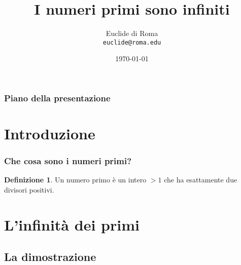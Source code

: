 \documentclass{beamer} %
\title{I numeri primi sono infiniti}
\author[Euclide]{Euclide di Roma\\\texttt{euclide@roma.edu}}
\date[Roma]{\today}
\institute[Roma]{DIPARTIMENTO DI INGEGNERIA INFORMATICA\\[-0.1cm] AUTOMATICA E GESTIONALE ANTONIO RUBERTI
}
\theoremstyle{definition}
\newtheorem{definizione}{Definizione}
\theoremstyle{plain}
\begin{document}

\titlepageframe %


\begin{frame}
  \frametitle{Piano della presentazione} %
  \tableofcontents %
\end{frame}




\section{Introduzione}

\begin{frame}
  \frametitle{Che cosa sono i numeri primi?} %
  \begin{definizione}
    Un \alert{numero primo} è un intero $>1$ che ha esattamente due divisori positivi.
  \end{definizione}
\end{frame}


\section{L'infinità dei primi}
\subsection{La dimostrazione}
\end{document}
